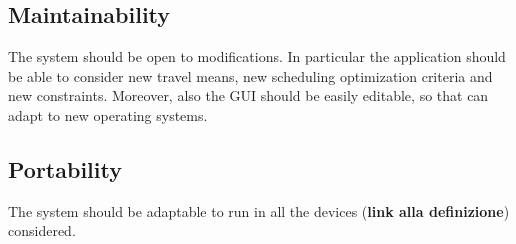 \subsection{Maintainability}
The system should be open to modifications.
In particular the application should be able to consider new travel means, new scheduling optimization criteria and new constraints.
Moreover, also the GUI should be easily editable, so that can adapt to new operating systems.

\subsection{Portability}
The system should be adaptable to run in all the devices (\textbf{link alla definizione}) considered.